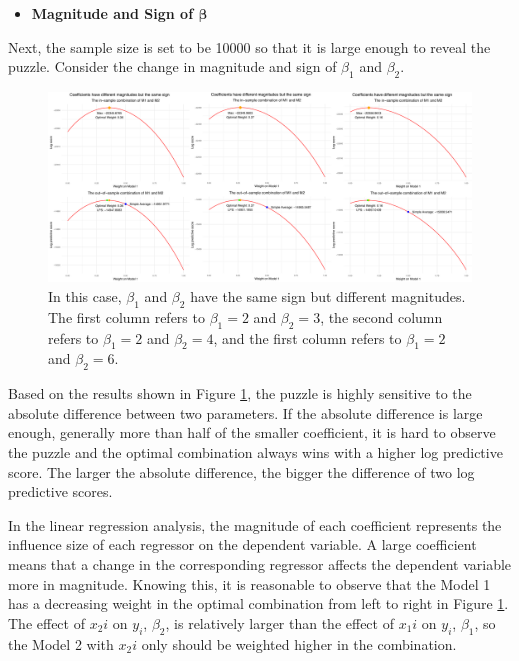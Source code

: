 \documentclass{monashthesis}
\begin{document}
\begin{itemize}
\tightlist
\item
  \bf{Magnitude and Sign of $\pmb{\beta}$}
\end{itemize}

Next, the sample size is set to be 10000 so that it is large enough to reveal the puzzle. Consider the change in magnitude and sign of \(\beta_1\) and \(\beta_2\).

\begin{figure}[ht]
\centering
\includegraphics[scale=0.35]{figures/Beta_diff_mag.png}
\caption{In this case, $\beta_1$ and $\beta_2$ have the same sign but different magnitudes. The first column refers to $\beta_1=2$ and $\beta_2=3$, the second column refers to $\beta_1=2$ and $\beta_2=4$, and the first column refers to $\beta_1=2$ and $\beta_2=6$.}
\label{fig:magnitude}
\end{figure}

Based on the results shown in Figure \ref{fig:magnitude}, the puzzle is highly sensitive to the absolute difference between two parameters. If the absolute difference is large enough, generally more than half of the smaller coefficient, it is hard to observe the puzzle and the optimal combination always wins with a higher log predictive score. The larger the absolute difference, the bigger the difference of two log predictive scores.

In the linear regression analysis, the magnitude of each coefficient represents the influence size of each regressor on the dependent variable. A large coefficient means that a change in the corresponding regressor affects the dependent variable more in magnitude. Knowing this, it is reasonable to observe that the Model 1 has a decreasing weight in the optimal combination from left to right in Figure \ref{fig:magnitude}. The effect of \(x_2i\) on \(y_i\), \(\beta_2\), is relatively larger than the effect of \(x_1i\) on \(y_i\), \(\beta_1\), so the Model 2 with \(x_2i\) only should be weighted higher in the combination.
\end{document}
